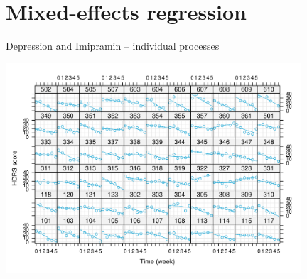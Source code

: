 \documentclass[aspectratio=169]{beamer}
\begin{document}
\section{Mixed-effects regression}

\begin{frame}{Depression and Imipramin -- individual processes}
  \vspace{-.2cm}
  \begin{center}
    \includegraphics[width = 11cm]{../figures/hdrs-ind}
  \end{center}
\end{frame}
\end{document}

